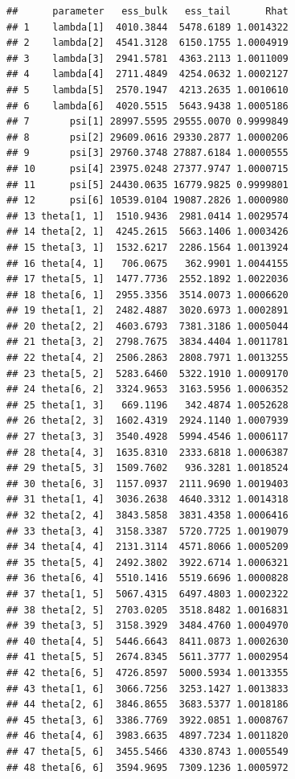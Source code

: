 \documentclass[
]{article}
\newenvironment{Shaded}{\begin{snugshade}}{\end{snugshade}}
\newcommand{\NormalTok}[1]{#1}
\newcommand{\SpecialCharTok}[1]{\textcolor[rgb]{0.81,0.36,0.00}{\textbf{#1}}}
\begin{document}
\linespread{1}

\begin{Shaded}
\end{Shaded}

\begin{verbatim}
##      parameter   ess_bulk   ess_tail      Rhat
## 1    lambda[1]  4010.3844  5478.6189 1.0014322
## 2    lambda[2]  4541.3128  6150.1755 1.0004919
## 3    lambda[3]  2941.5781  4363.2113 1.0011009
## 4    lambda[4]  2711.4849  4254.0632 1.0002127
## 5    lambda[5]  2570.1947  4213.2635 1.0010610
## 6    lambda[6]  4020.5515  5643.9438 1.0005186
## 7       psi[1] 28997.5595 29555.0070 0.9999849
## 8       psi[2] 29609.0616 29330.2877 1.0000206
## 9       psi[3] 29760.3748 27887.6184 1.0000555
## 10      psi[4] 23975.0248 27377.9747 1.0000715
## 11      psi[5] 24430.0635 16779.9825 0.9999801
## 12      psi[6] 10539.0104 19087.2826 1.0000980
## 13 theta[1, 1]  1510.9436  2981.0414 1.0029574
## 14 theta[2, 1]  4245.2615  5663.1406 1.0003426
## 15 theta[3, 1]  1532.6217  2286.1564 1.0013924
## 16 theta[4, 1]   706.0675   362.9901 1.0044155
## 17 theta[5, 1]  1477.7736  2552.1892 1.0022036
## 18 theta[6, 1]  2955.3356  3514.0073 1.0006620
## 19 theta[1, 2]  2482.4887  3020.6973 1.0002891
## 20 theta[2, 2]  4603.6793  7381.3186 1.0005044
## 21 theta[3, 2]  2798.7675  3834.4404 1.0011781
## 22 theta[4, 2]  2506.2863  2808.7971 1.0013255
## 23 theta[5, 2]  5283.6460  5322.1910 1.0009170
## 24 theta[6, 2]  3324.9653  3163.5956 1.0006352
## 25 theta[1, 3]   669.1196   342.4874 1.0052628
## 26 theta[2, 3]  1602.4319  2924.1140 1.0007939
## 27 theta[3, 3]  3540.4928  5994.4546 1.0006117
## 28 theta[4, 3]  1635.8310  2333.6818 1.0006387
## 29 theta[5, 3]  1509.7602   936.3281 1.0018524
## 30 theta[6, 3]  1157.0937  2111.9690 1.0019403
## 31 theta[1, 4]  3036.2638  4640.3312 1.0014318
## 32 theta[2, 4]  3843.5858  3831.4358 1.0006416
## 33 theta[3, 4]  3158.3387  5720.7725 1.0019079
## 34 theta[4, 4]  2131.3114  4571.8066 1.0005209
## 35 theta[5, 4]  2492.3802  3922.6714 1.0006321
## 36 theta[6, 4]  5510.1416  5519.6696 1.0000828
## 37 theta[1, 5]  5067.4315  6497.4803 1.0002322
## 38 theta[2, 5]  2703.0205  3518.8482 1.0016831
## 39 theta[3, 5]  3158.3929  3484.4760 1.0004970
## 40 theta[4, 5]  5446.6643  8411.0873 1.0002630
## 41 theta[5, 5]  2674.8345  5611.3777 1.0002954
## 42 theta[6, 5]  4726.8597  5000.5934 1.0013355
## 43 theta[1, 6]  3066.7256  3253.1427 1.0013833
## 44 theta[2, 6]  3846.8655  3683.5377 1.0018186
## 45 theta[3, 6]  3386.7769  3922.0851 1.0008767
## 46 theta[4, 6]  3983.6635  4897.7234 1.0011820
## 47 theta[5, 6]  3455.5466  4330.8743 1.0005549
## 48 theta[6, 6]  3594.9695  7309.1236 1.0005972
\end{verbatim}
\end{document}
